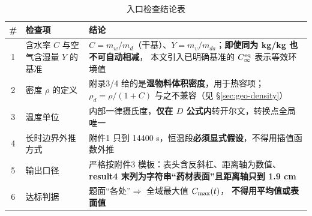 \begin{table}[H]
  \centering
  \caption{入口检查结论表}
  \label{tab:entry}
  \footnotesize
  \begin{tabularx}{\textwidth}{@{}clX@{}}
    \toprule
    \# & 检查项 & 结论 \\
    \midrule
    1 & 含水率 $C$ 与空气含湿量 $Y$ 的基准 &
      $C=m_w/m_d$（干基）、$Y=m_v/m_{da}$；\textbf{即使同为 kg/kg 也不可自动相减}，
      本文引入已明确基准的 $C_\infty^{\mathrm{eq}}$ 表示等效环境值 \\
    2 & 密度 $\rho$ 的定义 &
      附录3/4 给的是\textbf{湿物料体积密度}，用于热容项；
      $\rho_d=\rho/(1+C)$ 与之不兼容（见 \S\ref{sec:geo-density}） \\
    3 & 温度单位 &
      内部一律摄氏度，\textbf{仅在 $D$ 公式内}转开尔文，转换点全局唯一 \\
    4 & 长时边界外推方式 &
      附件1 只到 14400 s，恒温段\textbf{必须显式假设}，不得用插值函数外推 \\
    5 & 输出口径 &
      严格按附件3 模板：表头含反斜杠、距离轴为数值、
      \textbf{result4 末列为字符串``药材表面''且距离轴只到 1.9 cm} \\
    6 & 达标判据 &
      题面``各处''$\Rightarrow$ 全域最大值 $C_{\max}(t)$，
      \textbf{不得用平均值或表面值} \\
    \bottomrule
  \end{tabularx}
\end{table}

